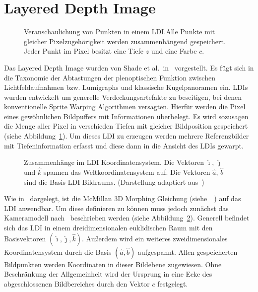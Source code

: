 \documentclass[hyperref, beleg, german]{cgvpub}
\begin{document}
\section{Layered Depth Image}

\begin{figure}
	\centering
	
	\caption{Veranschaulichung von Punkten in einem LDI.\@ Alle Punkte mit
		gleicher Pixelzugehörigkeit werden zusammenhängend gespeichert. Jeder
		Punkt im Pixel besitzt eine Tiefe \(z\) und eine Farbe \(c\).}%
	\label{fig:layereddepthimage}
\end{figure}

Das Layered Depth Image wurden von Shade et al.\ in~\cite{he1998layered}
vorgestellt. Es fügt sich in die Taxonomie der Abtastungen der plenoptischen
Funktion zwischen Lichtfeldaufnahmen bzw. Lumigraphs und klassische
Kugelpanoramen ein. LDIs wurden entwickelt um generelle Verdeckungsartefakte zu
beseitigen, bei denen konventionelle Sprite Warping Algorithmen versagten.
Hierfür werden die Pixel eines gewöhnlichen Bildpuffers mit Informationen
überbelegt. Es wird sozusagen die Menge aller Pixel in verschieden Tiefen mit
gleicher Bildposition gespeichert (siehe
Abbildung~\ref{fig:layereddepthimage}). Um dieses LDI zu erzeugen werden
mehrere Referenzbilder mit Tiefeninformation erfasst und diese dann in die
Ansicht des LDIs gewarpt.

\begin{figure}
	\centering
	
	\caption{Zusammenhänge im LDI Koordinatensystem. Die Vektoren \( \hat{\imath}
		\), \( \hat{\jmath} \) und \( \hat{k} \) spannen das Weltkoordinatensystem
		auf. Die Vektoren \( \hat{a} \), \( \hat{b} \) sind die Basis LDI
		Bildraums. (Darstellung adaptiert aus~\cite{mcmillan1997image})}%
	\label{fig:ldicoord}
\end{figure}

Wie in~\cite{chang1999ldi} dargelegt, ist die McMillan 3D Morphing Gleichung
(siehe~\cite{mcmillan1995list}~\cite{mcmillan1995plenoptic}) auf das LDI
anwendbar. Um diese definieren zu können muss jedoch zunächst das Kameramodell
nach~\cite{mcmillan1997image} beschrieben werden (siehe
Abbildung~\ref{fig:ldicoord}). Generell befindet sich das LDI in einem
dreidimensionalen euklidischen Raum mit den Basisvektoren \( (\hat{\imath},
\hat{\jmath}, \hat{k}) \). Außerdem wird ein weiteres zweidimensionales
Koordinatensystem durch die Basis \( (\hat{a}, \hat{b}) \) aufgespannt. Allen
gespeicherten Bildpunkten werden Koordinaten in dieser Bildebene zugewiesen.
Ohne Beschränkung der Allgemeinheit wird der Ursprung in eine Ecke des
abgeschlossenen Bildbereiches durch den Vektor \( c \) festgelegt.
\end{document}
